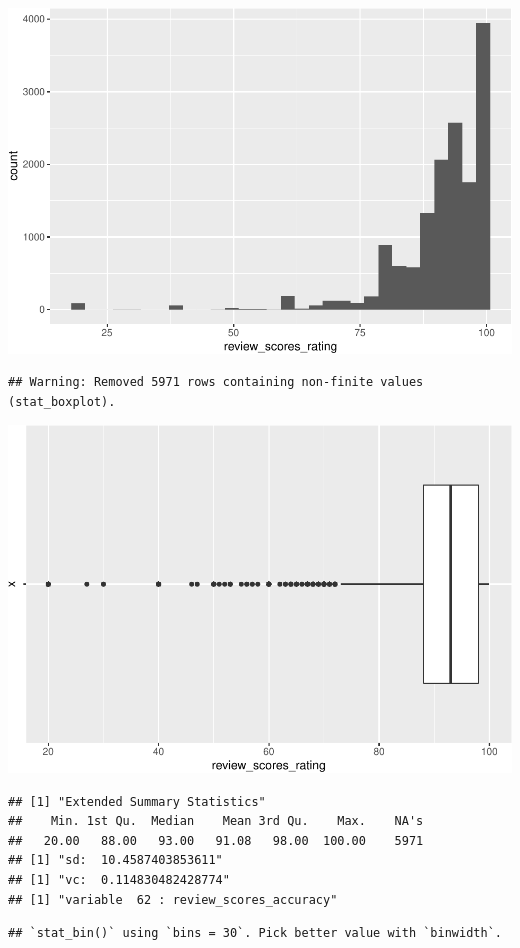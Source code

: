 \includegraphics{anal_files/figure-latex/unnamed-chunk-9-42.pdf}

\begin{verbatim}
## Warning: Removed 5971 rows containing non-finite values (stat_boxplot).
\end{verbatim}

\includegraphics{anal_files/figure-latex/unnamed-chunk-9-43.pdf}

\begin{verbatim}
## [1] "Extended Summary Statistics"
##    Min. 1st Qu.  Median    Mean 3rd Qu.    Max.    NA's 
##   20.00   88.00   93.00   91.08   98.00  100.00    5971 
## [1] "sd:  10.4587403853611"
## [1] "vc:  0.114830482428774"
## [1] "variable  62 : review_scores_accuracy"
\end{verbatim}

\begin{verbatim}
## `stat_bin()` using `bins = 30`. Pick better value with `binwidth`.
\end{verbatim}

